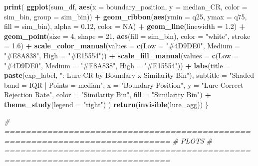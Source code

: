 \documentclass[
]{article}
\newenvironment{Shaded}{\begin{snugshade}}{\end{snugshade}}
\newcommand{\AttributeTok}[1]{\textcolor[rgb]{0.13,0.29,0.53}{#1}}
\newcommand{\CommentTok}[1]{\textcolor[rgb]{0.56,0.35,0.01}{\textit{#1}}}
\newcommand{\ConstantTok}[1]{\textcolor[rgb]{0.56,0.35,0.01}{#1}}
\newcommand{\DecValTok}[1]{\textcolor[rgb]{0.00,0.00,0.81}{#1}}
\newcommand{\FloatTok}[1]{\textcolor[rgb]{0.00,0.00,0.81}{#1}}
\newcommand{\FunctionTok}[1]{\textcolor[rgb]{0.13,0.29,0.53}{\textbf{#1}}}
\newcommand{\NormalTok}[1]{#1}
\newcommand{\SpecialCharTok}[1]{\textcolor[rgb]{0.81,0.36,0.00}{\textbf{#1}}}
\newcommand{\StringTok}[1]{\textcolor[rgb]{0.31,0.60,0.02}{#1}}
\begin{document}
\begin{Shaded}
\begin{Highlighting}[]
  \FunctionTok{print}\NormalTok{(}
    \FunctionTok{ggplot}\NormalTok{(sum\_df, }\FunctionTok{aes}\NormalTok{(}\AttributeTok{x =}\NormalTok{ boundary\_position, }\AttributeTok{y =}\NormalTok{ median\_CR,}
                       \AttributeTok{color =}\NormalTok{ sim\_bin, }\AttributeTok{group =}\NormalTok{ sim\_bin)) }\SpecialCharTok{+}
      \FunctionTok{geom\_ribbon}\NormalTok{(}\FunctionTok{aes}\NormalTok{(}\AttributeTok{ymin =}\NormalTok{ q25, }\AttributeTok{ymax =}\NormalTok{ q75, }\AttributeTok{fill =}\NormalTok{ sim\_bin),}
                  \AttributeTok{alpha =} \FloatTok{0.12}\NormalTok{, }\AttributeTok{color =} \ConstantTok{NA}\NormalTok{) }\SpecialCharTok{+}
      \FunctionTok{geom\_line}\NormalTok{(}\AttributeTok{linewidth =} \FloatTok{1.2}\NormalTok{) }\SpecialCharTok{+}
      \FunctionTok{geom\_point}\NormalTok{(}\AttributeTok{size =} \DecValTok{4}\NormalTok{, }\AttributeTok{shape =} \DecValTok{21}\NormalTok{, }\FunctionTok{aes}\NormalTok{(}\AttributeTok{fill =}\NormalTok{ sim\_bin),}
                 \AttributeTok{color =} \StringTok{"white"}\NormalTok{, }\AttributeTok{stroke =} \FloatTok{1.6}\NormalTok{) }\SpecialCharTok{+}
      \FunctionTok{scale\_color\_manual}\NormalTok{(}\AttributeTok{values =} \FunctionTok{c}\NormalTok{(}\AttributeTok{Low =} \StringTok{"\#4D9DE0"}\NormalTok{, }\AttributeTok{Medium =} \StringTok{"\#E8A838"}\NormalTok{, }\AttributeTok{High =} \StringTok{"\#E15554"}\NormalTok{)) }\SpecialCharTok{+}
      \FunctionTok{scale\_fill\_manual}\NormalTok{(}\AttributeTok{values  =} \FunctionTok{c}\NormalTok{(}\AttributeTok{Low =} \StringTok{"\#4D9DE0"}\NormalTok{, }\AttributeTok{Medium =} \StringTok{"\#E8A838"}\NormalTok{, }\AttributeTok{High =} \StringTok{"\#E15554"}\NormalTok{)) }\SpecialCharTok{+}
      \FunctionTok{labs}\NormalTok{(}\AttributeTok{title    =} \FunctionTok{paste}\NormalTok{(exp\_label, }\StringTok{": Lure CR by Boundary x Similarity Bin"}\NormalTok{),}
           \AttributeTok{subtitle =} \StringTok{"Shaded band = IQR | Points = median"}\NormalTok{,}
           \AttributeTok{x =} \StringTok{"Boundary Position"}\NormalTok{, }\AttributeTok{y =} \StringTok{"Lure Correct Rejection Rate"}\NormalTok{,}
           \AttributeTok{color =} \StringTok{"Similarity Bin"}\NormalTok{, }\AttributeTok{fill =} \StringTok{"Similarity Bin"}\NormalTok{) }\SpecialCharTok{+}
      \FunctionTok{theme\_study}\NormalTok{(}\AttributeTok{legend =} \StringTok{"right"}\NormalTok{)}
\NormalTok{  )}
  \FunctionTok{return}\NormalTok{(}\FunctionTok{invisible}\NormalTok{(lure\_agg))}
\NormalTok{\}}

\CommentTok{\# =============================================================================}
\CommentTok{\# PLOTS}
\CommentTok{\# =============================================================================}


\end{Highlighting}
\end{Shaded}
\end{document}
